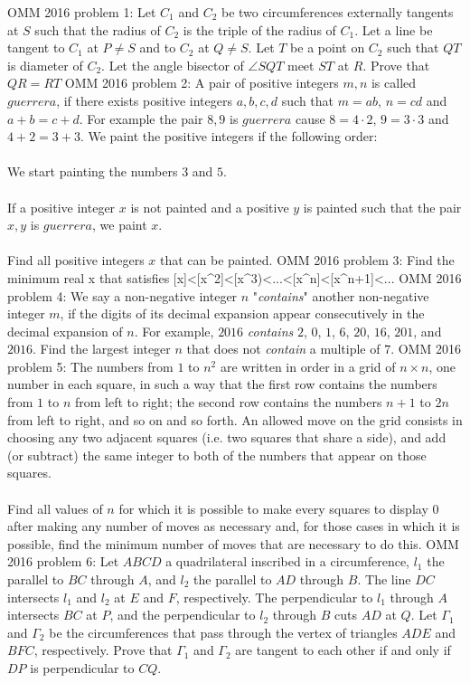 OMM 2016 problem 1:  Let $C_1$ and $C_2$ be two circumferences externally tangents at $S$ such that the radius of $C_2$ is the triple of the radius of $C_1$. Let a line be tangent to $C_1$ at $P \neq S$ and to $C_2$ at $Q \neq S$. Let $T$ be a point on $C_2$ such that $QT$ is diameter of $C_2$. Let the angle bisector of $\angle SQT$ meet $ST$ at $R$. Prove that $QR=RT$ 
OMM 2016 problem 2:  A pair of positive integers $m, n$ is called $guerrera$, if there exists positive integers $a, b, c, d$ such that $m=ab$, $n=cd$ and $a+b=c+d$. For example the pair $8, 9$ is $guerrera$ cause $8= 4 \cdot 2$, $9= 3 \cdot 3$ and $4+2=3+3$. We paint the positive integers if the following order: \\\\
We start painting the numbers $3$ and $5$. \\\\
If a positive integer $x$ is not painted and a positive $y$ is painted such that the pair $x, y$ is $guerrera$, we paint $x$. \\\\
Find all positive integers $x$ that can be painted. 
OMM 2016 problem 3:  Find the minimum real x that satisfies [x]<[x^2]<[x^3)<...<[x^n]<[x^n+1]<... 
OMM 2016 problem 4:  We say a non-negative integer $n$ "\textit{contains}" another non-negative integer $m$, if the digits of its decimal expansion appear consecutively in the decimal expansion of $n$. For example, $2016$ \textit{contains} $2$, $0$, $1$, $6$, $20$, $16$, $201$, and $2016$. Find the largest integer $n$ that does not \textit{contain} a multiple of $7$. 
OMM 2016 problem 5:  The numbers from $1$ to $n^2$ are written in order in a grid of $n \times n$, one number in each square, in such a way that the first row contains the numbers from $1$ to $n$ from left to right; the second row contains the numbers $n + 1$ to $2n$ from left to right, and so on and so forth. An allowed move on the grid consists in choosing any two adjacent squares (i.e. two squares that share a side), and add (or subtract) the same integer to both of the numbers that appear on those squares. \\\\
Find all values of $n$ for which it is possible to make every squares to display $0$ after making any number of moves as necessary and, for those cases in which it is possible, find the minimum number of moves that are necessary to do this. 
OMM 2016 problem 6:  Let $ABCD$ a quadrilateral inscribed in a circumference, $l_1$ the parallel to $BC$ through $A$, and $l_2$ the parallel to $AD$ through $B$. The line $DC$ intersects $l_1$ and $l_2$ at $E$ and $F$, respectively. The perpendicular to $l_1$ through $A$ intersects $BC$ at $P$, and the perpendicular to $l_2$ through $B$ cuts $AD$ at $Q$. Let $\Gamma_1$ and $\Gamma_2$ be the circumferences that pass through the vertex of triangles $ADE$ and $BFC$, respectively. Prove that $\Gamma_1$ and $\Gamma_2$ are tangent to each other if and only if $DP$ is perpendicular to $CQ$. 

